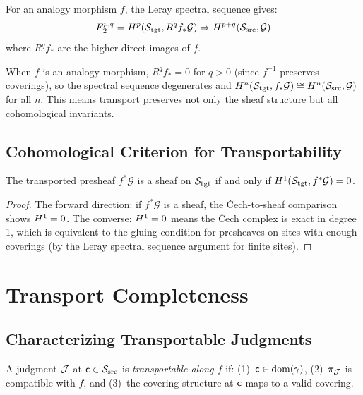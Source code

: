 \documentclass[11pt]{article}
\newcommand{\SourceSite}{\Site_{\mathrm{src}}}
\newcommand{\TargetSite}{\Site_{\mathrm{tgt}}}
\newcommand{\ProofCert}{\pi}
\newcommand{\CompMap}{\gamma}
\begin{document}
\begin{proposition}\label{prop:leray}
For an analogy morphism $f$, the Leray spectral sequence gives:
\[
  E_2^{p,q} = \Hcoh{p}(\TargetSite, R^q f_{*}\mathcal{G})
  \Rightarrow \Hcoh{p+q}(\SourceSite, \mathcal{G})
\]
where $R^q f_{*}$ are the higher direct images of $f$.
\end{proposition}

When $f$ is an analogy morphism, $R^q f_{*} = 0$ for $q > 0$ (since
$f^{-1}$ preserves coverings), so the spectral sequence degenerates
and $\Hcoh{n}(\TargetSite, f_{*}\mathcal{G}) \cong
\Hcoh{n}(\SourceSite, \mathcal{G})$ for all $n$.  This means transport
preserves not only the sheaf structure but all cohomological invariants.

\subsection{Cohomological Criterion for Transportability}

\begin{theorem}\label{thm:cohom-transport}
The transported presheaf $f^{*}\mathcal{G}$ is a sheaf on $\TargetSite$ if
and only if $\Hcoh{1}(\TargetSite, f^{*}\mathcal{G}) = 0$.
\end{theorem}

\begin{proof}
The forward direction: if $f^{*}\mathcal{G}$ is a sheaf, the
\v{C}ech-to-sheaf comparison shows $H^{1} = 0$.  The converse:
$H^{1} = 0$ means the \v{C}ech complex is exact in degree 1,
which is equivalent to the gluing condition for presheaves on sites with
enough coverings (by the Leray spectral sequence argument for finite sites).
\end{proof}

\section{Transport Completeness}\label{sec:completeness}

\subsection{Characterizing Transportable Judgments}

\begin{definition}\label{def:transportable}
A judgment $\mathcal{J}$ at $\coord \in \SourceSite$ is
\emph{transportable along $f$} if:
(1)~$\coord \in \mathrm{dom}(\CompMap)$,
(2)~$\ProofCert_{\J}$ is compatible with $f$, and
(3)~the covering structure at $\mathsf{c}$ maps to a valid covering.
\end{definition}
\end{document}
